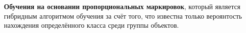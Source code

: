 \message{ !name(report.tex)}\documentclass[12pt,a4paper]{article}
\begin{document}
\textbf{Обучения
  на основании пропорциональных маркировок}, который является
гибридным алгоритмом обучения за счёт того, что известна только
вероянтость нахождения определённого класса среди группы объектов.


\end{document}
